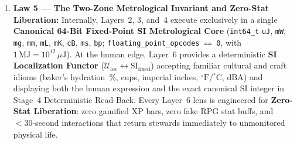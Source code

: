 \begin{enumerate}
          Replacement Cost $\lambda_{\mathrm{ERC}}$). Upward ($\Pi_{\mathrm{up}}^{\mathrm{diff}}$),
          whenever Layer~4's \textbf{3-Tier BPMN Hardware Adaptation Cascade} (\textit{Tier~1: SI
          Parameter Scaling $\to$ Tier~2: Macro-Activity Substitution $\to$ Tier~3: True-Constraint
          Hard-Block}) or Layer~5's policy engine hits an unresolvable boundary,
          \texttt{col-commonsd} decompiles the machine yield packet into a plain-language
          \textbf{Layer~6 Semantic Diff Card}.
    \item \textbf{Law 5 --- The Two-Zone Metrological Invariant and Zero-Stat Liberation:}
          Internally, Layers~2, 3, and~4 execute exclusively in a single \textbf{Canonical 64-Bit
          Fixed-Point SI Metrological Core} (\texttt{int64\_t} \texttt{uJ}, \texttt{mW},
          \texttt{mg}, \texttt{mm}, \texttt{mL}, \texttt{mK}, \texttt{cB}, \texttt{ms}, \texttt{bp};
          \texttt{floating\_point\_opcodes == 0}, with $1\,\mathrm{MJ} = 10^{12}\,\mu\mathrm{J}$).
          At the human edge, Layer~6 provides a deterministic \textbf{SI Localization Functor}
          ($\mathcal{U}_{\mathrm{loc}} \leftrightarrow \mathrm{SI}_{\mathrm{fixed}}$) accepting
          familiar cultural and craft idioms (baker's hydration~$\%$, cups, imperial inches,
          $^\circ\mathrm{F}/^\circ\mathrm{C}$, $\mathrm{dBA}$) and displaying both the human
          expression and the exact canonical SI integer in Stage~4 Deterministic Read-Back. Every
          Layer~6 lens is engineered for \textbf{Zero-Stat Liberation}: zero gamified XP bars, zero
          fake RPG stat buffs, and $<30$-second interactions that return stewards immediately to
          unmonitored physical life.
\end{enumerate}


